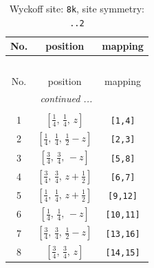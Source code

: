 \documentclass[fleqn,8pt]{jsarticle}
\begin{document}
\begin{longtable}{ccc}
\caption{Wyckoff site: {\tt 8k}, site symmetry: {\tt ..2}}
 \\
 \hline \hline
No. & position & mapping \\ \hline \endfirsthead

\multicolumn{2}{l}{\tablename\ \thetable{}} \\
 \hline \hline
No. & position & mapping \\ \hline \endhead

 \hline \hline
\multicolumn{2}{r}{\footnotesize\it continued ...} \\ \endfoot

 \hline \hline
\multicolumn{2}{r}{} \\ \endlastfoot

1 & $\left[ \frac{1}{4},\, \frac{1}{4},\, z \right]$ & {\tt [1,4]} \\ \hline
2 & $\left[ \frac{1}{4},\, \frac{1}{4},\, \frac{1}{2} - z \right]$ & {\tt [2,3]} \\ \hline
3 & $\left[ \frac{3}{4},\, \frac{3}{4},\, - z \right]$ & {\tt [5,8]} \\ \hline
4 & $\left[ \frac{3}{4},\, \frac{3}{4},\, z + \frac{1}{2} \right]$ & {\tt [6,7]} \\ \hline
5 & $\left[ \frac{1}{4},\, \frac{1}{4},\, z + \frac{1}{2} \right]$ & {\tt [9,12]} \\ \hline
6 & $\left[ \frac{1}{4},\, \frac{1}{4},\, - z \right]$ & {\tt [10,11]} \\ \hline
7 & $\left[ \frac{3}{4},\, \frac{3}{4},\, \frac{1}{2} - z \right]$ & {\tt [13,16]} \\ \hline
8 & $\left[ \frac{3}{4},\, \frac{3}{4},\, z \right]$ & {\tt [14,15]} \\
\end{longtable}
\renewcommand{\arraystretch}{1.2}
\end{document}
